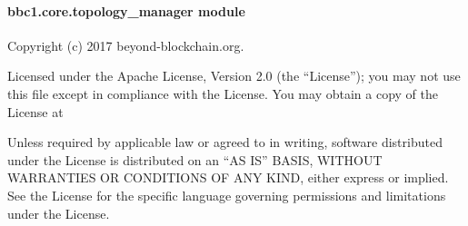 \documentclass[letterpaper,10pt,english]{sphinxmanual}
\begin{document}
\paragraph{bbc1.core.topology\_manager module}
\label{\detokenize{bbc1.core.topology_manager:bbc1-core-topology-manager-module}}\label{\detokenize{bbc1.core.topology_manager:module-bbc1.core.topology_manager}}\label{\detokenize{bbc1.core.topology_manager::doc}}
Copyright (c) 2017 beyond-blockchain.org.

Licensed under the Apache License, Version 2.0 (the “License”);
you may not use this file except in compliance with the License.
You may obtain a copy of the License at
\begin{quote}

\end{quote}

Unless required by applicable law or agreed to in writing, software
distributed under the License is distributed on an “AS IS” BASIS,
WITHOUT WARRANTIES OR CONDITIONS OF ANY KIND, either express or implied.
See the License for the specific language governing permissions and
limitations under the License.
\end{document}
